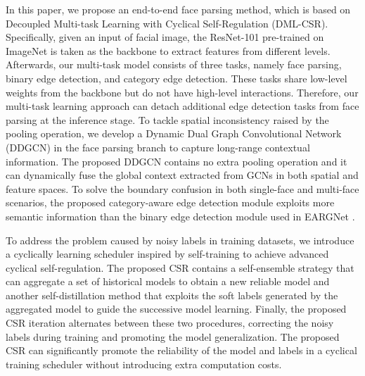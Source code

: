 \documentclass[10pt,twocolumn,letterpaper]{article}
\begin{document}
In this paper, we propose an end-to-end face parsing method, which is based on Decoupled Multi-task Learning with Cyclical Self-Regulation (DML-CSR). Specifically, given an input of facial image, the ResNet-101 \cite{resnet101} pre-trained on ImageNet is taken as the backbone to extract features from different levels. Afterwards, our multi-task model consists of three tasks, namely face parsing, binary edge detection, and category edge detection. These tasks share low-level weights from the backbone but do not have high-level interactions. Therefore, our multi-task learning approach can detach additional edge detection tasks from face parsing at the inference stage. To tackle spatial inconsistency raised by the pooling operation, we develop a Dynamic Dual Graph Convolutional Network (DDGCN) in the face parsing branch to capture long-range contextual information. The proposed DDGCN contains no extra pooling operation and it can dynamically fuse the global context extracted from GCNs in both spatial and feature spaces. To solve the boundary confusion in both single-face and multi-face scenarios, the proposed category-aware edge detection module exploits more semantic information than the binary edge detection module used in EARGNet \cite{te2020edge}. 

To address the problem caused by noisy labels in training datasets, we introduce a cyclically learning scheduler inspired by self-training \cite{Yarowsky1995UnsupervisedWS, self_train_theory, Yarowsky1995UnsupervisedWS, Zoph2020RethinkingPA, Yalniz2019BillionscaleSL, Chen2020LeveragingSL,li2020self} to achieve advanced cyclical self-regulation. 
The proposed CSR contains a self-ensemble strategy that can aggregate a set of historical models to obtain a new reliable model and another self-distillation method that exploits the soft labels generated by the aggregated model to guide the successive model learning. Finally, the proposed CSR iteration alternates between these two procedures, correcting the noisy labels during training and promoting the model generalization. The proposed CSR can significantly promote the reliability of the model and labels in a cyclical training scheduler without introducing extra computation costs.
\end{document}
